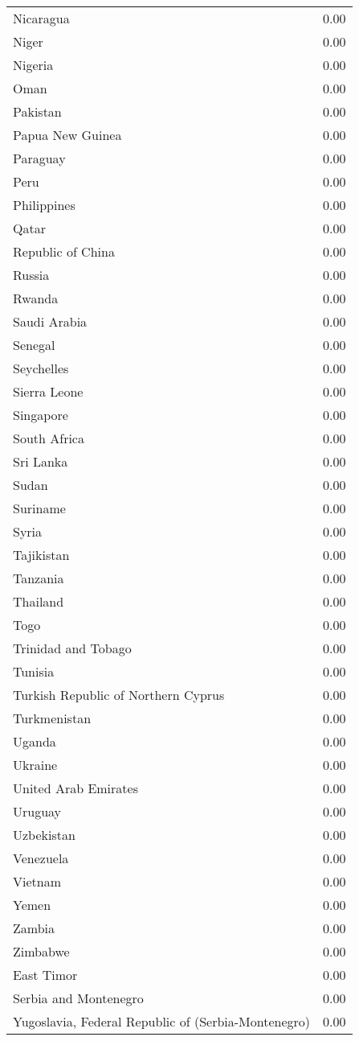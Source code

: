 \begin{table}[ht]
\begin{tabular}{lr}
  Nicaragua & 0.00 \\ 
  Niger & 0.00 \\ 
  Nigeria & 0.00 \\ 
  Oman & 0.00 \\ 
  Pakistan & 0.00 \\ 
  Papua New Guinea & 0.00 \\ 
  Paraguay & 0.00 \\ 
  Peru & 0.00 \\ 
  Philippines & 0.00 \\ 
  Qatar & 0.00 \\ 
  Republic of China & 0.00 \\ 
  Russia & 0.00 \\ 
  Rwanda & 0.00 \\ 
  Saudi Arabia & 0.00 \\ 
  Senegal & 0.00 \\ 
  Seychelles & 0.00 \\ 
  Sierra Leone & 0.00 \\ 
  Singapore & 0.00 \\ 
  South Africa & 0.00 \\ 
  Sri Lanka & 0.00 \\ 
  Sudan & 0.00 \\ 
  Suriname & 0.00 \\ 
  Syria & 0.00 \\ 
  Tajikistan & 0.00 \\ 
  Tanzania & 0.00 \\ 
  Thailand & 0.00 \\ 
  Togo & 0.00 \\ 
  Trinidad and Tobago & 0.00 \\ 
  Tunisia & 0.00 \\ 
  Turkish Republic of Northern Cyprus & 0.00 \\ 
  Turkmenistan & 0.00 \\ 
  Uganda & 0.00 \\ 
  Ukraine & 0.00 \\ 
  United Arab Emirates & 0.00 \\ 
  Uruguay & 0.00 \\ 
  Uzbekistan & 0.00 \\ 
  Venezuela & 0.00 \\ 
  Vietnam & 0.00 \\ 
  Yemen & 0.00 \\ 
  Zambia & 0.00 \\ 
  Zimbabwe & 0.00 \\ 
  East Timor & 0.00 \\ 
  Serbia and Montenegro & 0.00 \\ 
  Yugoslavia, Federal Republic of (Serbia-Montenegro) & 0.00 \\ 
   \hline
\end{tabular}
\end{table}
